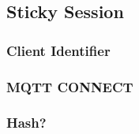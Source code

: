 \subsection{Sticky Session}
\subsubsection{Client Identifier}
\subsubsection{MQTT CONNECT}

\subsubsection{Hash?}

\begin{comment}
- This is supposed to be the core of your thesis or project. Describe your work from a con-ceptual viewpoint.
- Example: In case you have developed some prototypical tool in your bachelor thesis, demonstrate how it is employed in its business context. More concrete example: Assume that your contribution is a Maven-Build-Plugin that further automates the deployment of changes to the claim handling process into production. In this case show how the plugin is integrated in the overall (continuous) integration and deployment process, which human ac-tors are involved, which external systems and so on. Elaborate on subtle edge cases you had to deal with, e.g., possible outages of external systems.
- Usedi  agramswhere appropriate. Standard notations are better than informal box-and-line-diagrams. Typical standard notations for a solution concept are
  - Business Process Modelling Notation (BPMN) or UML activity diagrams, that depict a workflow in which your tool is used
  - UML component diagrams, where your tool is represented by just a single component (without its ingredients) together with connected external systems
\end{comment}
